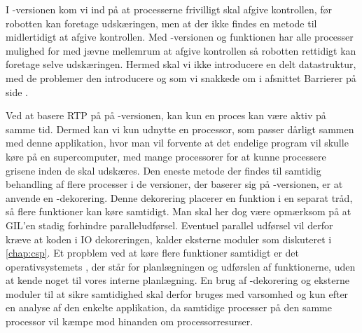 I -versionen kom vi ind på at processerne frivilligt skal afgive kontrollen, før robotten kan foretage udskæringen, men at der ikke findes en metode til midlertidigt at afgive kontrollen. Med -versionen og funktionen  har alle processer mulighed for med jævne mellemrum at afgive kontrollen så robotten rettidigt kan foretage selve udskæringen. Hermed skal vi ikke introducere en delt datastruktur, med de problemer den introducere og som vi snakkede om i afsnittet Barrierer på side \pageref{sec:barrierer}.
  
Ved at basere RTP på  på -versionen, kan kun en proces  kan være aktiv på samme tid. Dermed kan vi kun udnytte en processor, som  passer dårligt sammen med denne applikation, hvor man vil forvente at det endelige program vil skulle køre på en supercomputer, med mange processorer for at kunne processere grisene inden de skal udskæres.  Den eneste metode der findes til samtidig behandling af flere processer i  de versioner, der baserer sig på -versionen, er at anvende en -dekorering. Denne dekorering placerer en funktion i en separat tråd, så flere funktioner kan køre samtidigt. Man skal her dog være opmærksom på at GIL'en stadig forhindre paralleludførsel. Eventuel parallel udførsel vil derfor kræve at koden i IO dekoreringen, kalder eksterne moduler som diskuteret i \cref{chap:csp}. Et propblem ved at køre flere funktioner samtidigt er det operativsystemets \sched, der står for planlægningen og udførslen af funktionerne, uden at kende noget til vores interne planlægning. En brug af -dekorering og eksterne moduler til at sikre samtidighed skal derfor bruges med varsomhed og kun efter en analyse af den enkelte applikation, da samtidige processer på den samme processor vil kæmpe mod hinanden om processorresurser.


 

